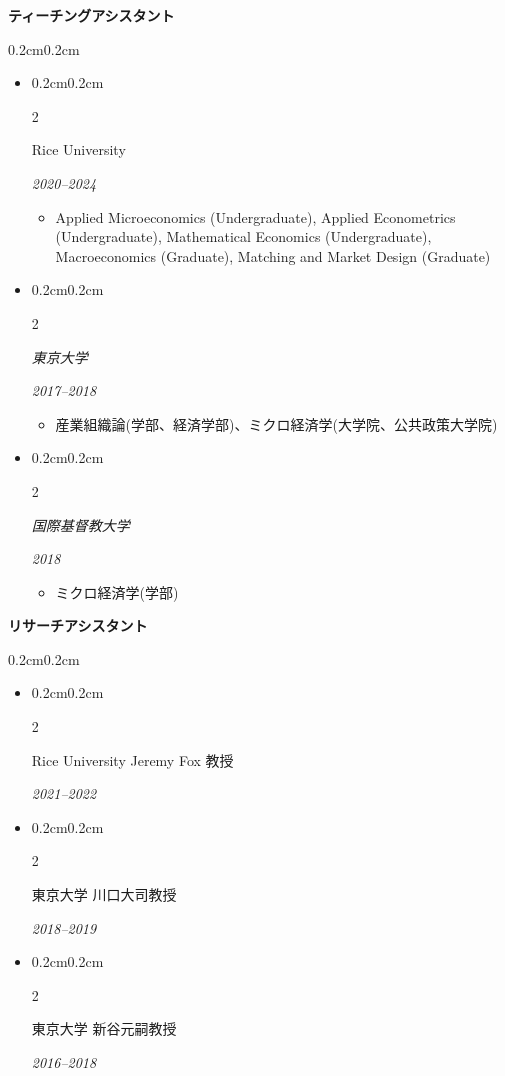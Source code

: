 \documentclass[10pt, letterpaper]{article}
\newenvironment{highlights}{
    \begin{itemize}[
        topsep=0.10cm,
        parsep=0.10cm,
        partopsep=0pt,
        itemsep=0.0cm,
        leftmargin=0.4cm + 10pt
    ]
}{
    \end{itemize}
}
\newenvironment{onecolentry}{
    \begin{adjustwidth}{0.2cm}{0.2cm}
}{
    \end{adjustwidth}
}
\newenvironment{twocolentry}[2][]{
    \onecolentry
    \def\secondColumn{#2}
    \setcolumnwidth{\fill, 4.5cm}
    \begin{paracol}{2}
}{
    \switchcolumn \raggedleft \secondColumn
    \end{paracol}
    \end{adjustwidth}
}
\begin{document}
    \textbf{ティーチングアシスタント}
    \vspace{0.10cm}
    \begin{onecolentry}
        \begin{highlights}
            \item \begin{twocolentry}{\textit{2020--2024}}
                Rice University
            \end{twocolentry}
            \begin{highlights}
                \item Applied Microeconomics (Undergraduate), Applied Econometrics (Undergraduate), Mathematical Economics (Undergraduate), Macroeconomics (Graduate), Matching and Market Design (Graduate)
            \end{highlights}
            \item \begin{twocolentry}{\textit{2017--2018}}
                \textit{東京大学}
            \end{twocolentry}
            \begin{highlights}
                \item 産業組織論(学部、経済学部)、ミクロ経済学(大学院、公共政策大学院)
            \end{highlights}
            \item \begin{twocolentry}{\textit{2018}}
                \textit{国際基督教大学}
            \end{twocolentry}
            \begin{highlights}
                \item ミクロ経済学(学部)
            \end{highlights}
        \end{highlights}
    \end{onecolentry}

    \textbf{リサーチアシスタント}
    \vspace{0.10cm}
    \begin{onecolentry}
        \begin{highlights}
            \item \begin{twocolentry}{\textit{2021--2022}}
                Rice University Jeremy Fox 教授
            \end{twocolentry}
            \item \begin{twocolentry}{\textit{2018--2019}}
                東京大学 川口大司教授
            \end{twocolentry}
            \item \begin{twocolentry}{\textit{2016--2018}}
                東京大学 新谷元嗣教授
            \end{twocolentry}
        \end{highlights}
    \end{onecolentry}
\end{document}
